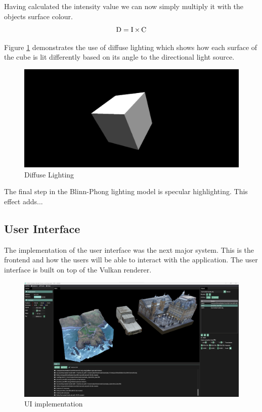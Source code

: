 \documentclass[11pt]{article}
\begin{document}
Having calculated the intensity value we can now simply multiply it with the objects
surface colour.
\begin{equation}
	\operatorname{D} = \operatorname{I} \times \operatorname{C}
\end{equation}

Figure \ref{fig:diffuse} demonstrates the use of diffuse lighting which shows how each
surface of the cube is lit differently based on its angle to the directional light 
source. 
\begin{figure}[h!]
  \centering
  \includegraphics[width=\textwidth]{images/diffuse_lighting.png}
  \caption{Diffuse Lighting}
  \label{fig:diffuse}
\end{figure}


The final step in the Blinn-Phong lighting model is specular highlighting. This effect
adds...


\subsection{User Interface}
The implementation of the user interface was the next major system. This is
the frontend and how the users will be able to interact with the application.
The user interface is built on top of the Vulkan renderer.


\begin{figure}[h!]
  \centering
  \includegraphics[width=\textwidth]{images/ui_implementation.png}
  \caption{UI implementation}
  \label{fig:user_interface}
\end{figure}
\end{document}
